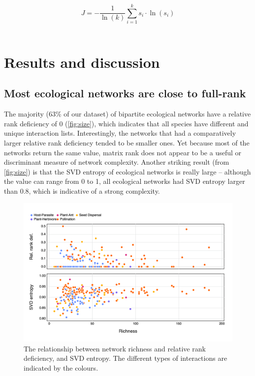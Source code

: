 \begin{refsection}
\[J = -\frac{1}{\ln(k)}\sum_{i=1}^k s_i\cdot\ln(s_i)\]\

\section{Results and discussion}\label{results-and-discussion-svd}

\subsection{Most ecological networks are close to
full-rank}\label{most-ecological-networks-are-close-to-full-rank}

The majority (63\% of our dataset) of bipartite ecological networks have a
relative rank deficiency of 0 (\autoref{fig:size}), which indicates that all
species have different and unique interaction lists. Interestingly, the networks
that had a comparatively larger relative rank deficiency tended to be smaller
ones. Yet because most of the networks return the same value, matrix rank does
not appear to be a useful or discriminant measure of network complexity. Another
striking result (from \autoref{fig:size}) is that the SVD entropy of ecological
networks is really large -- although the value can range from 0 to 1, all
ecological networks had SVD entropy larger than 0.8, which is indicative of a
strong complexity.

\begin{figure}[h]
    \centering
    \includegraphics[width=\textwidth]{figures/size_v_rankentropy.png}
    \caption{The relationship between network richness and relative rank
deficiency, and SVD entropy. The different types of interactions are indicated
by the colours.}
    \label{fig:size}
\end{figure}


\end{refsection}
